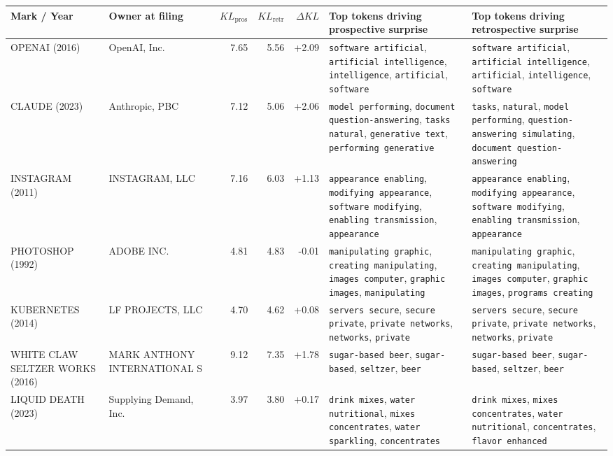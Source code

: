 \begin{tabular}{>{\raggedright\arraybackslash}p{3.4cm}>{\raggedright\arraybackslash}p{3.8cm}rrr >{\raggedright\arraybackslash}p{6.0cm} >{\raggedright\arraybackslash}p{6.0cm}}
\toprule
Mark / Year & Owner at filing & $KL_{\text{pros}}$ & $KL_{\text{retr}}$ & $\Delta KL$ & Top tokens driving prospective surprise & Top tokens driving retrospective surprise \\
\midrule
OPENAI (2016) & OpenAI, Inc. & 7.65 & 5.56 & +2.09 & \texttt{software artificial}, \texttt{artificial intelligence}, \texttt{intelligence}, \texttt{artificial}, \texttt{software} & \texttt{software artificial}, \texttt{artificial intelligence}, \texttt{artificial}, \texttt{intelligence}, \texttt{software} \\
CLAUDE (2023) & Anthropic, PBC & 7.12 & 5.06 & +2.06 & \texttt{model performing}, \texttt{document question-answering}, \texttt{tasks natural}, \texttt{generative text}, \texttt{performing generative} & \texttt{tasks}, \texttt{natural}, \texttt{model performing}, \texttt{question-answering simulating}, \texttt{document question-answering} \\
INSTAGRAM (2011) & INSTAGRAM, LLC & 7.16 & 6.03 & +1.13 & \texttt{appearance enabling}, \texttt{modifying appearance}, \texttt{software modifying}, \texttt{enabling transmission}, \texttt{appearance} & \texttt{appearance enabling}, \texttt{modifying appearance}, \texttt{software modifying}, \texttt{enabling transmission}, \texttt{appearance} \\
PHOTOSHOP (1992) & ADOBE INC. & 4.81 & 4.83 & -0.01 & \texttt{manipulating graphic}, \texttt{creating manipulating}, \texttt{images computer}, \texttt{graphic images}, \texttt{manipulating} & \texttt{manipulating graphic}, \texttt{creating manipulating}, \texttt{images computer}, \texttt{graphic images}, \texttt{programs creating} \\
KUBERNETES (2014) & LF PROJECTS, LLC & 4.70 & 4.62 & +0.08 & \texttt{servers secure}, \texttt{secure private}, \texttt{private networks}, \texttt{networks}, \texttt{private} & \texttt{servers secure}, \texttt{secure private}, \texttt{private networks}, \texttt{networks}, \texttt{private} \\
WHITE CLAW SELTZER WORKS (2016) & MARK ANTHONY INTERNATIONAL S & 9.12 & 7.35 & +1.78 & \texttt{sugar-based beer}, \texttt{sugar-based}, \texttt{seltzer}, \texttt{beer} & \texttt{sugar-based beer}, \texttt{sugar-based}, \texttt{seltzer}, \texttt{beer} \\
LIQUID DEATH (2023) & Supplying Demand, Inc. & 3.97 & 3.80 & +0.17 & \texttt{drink mixes}, \texttt{water nutritional}, \texttt{mixes concentrates}, \texttt{water sparkling}, \texttt{concentrates} & \texttt{drink mixes}, \texttt{mixes concentrates}, \texttt{water nutritional}, \texttt{concentrates}, \texttt{flavor enhanced} \\

\end{tabular}
